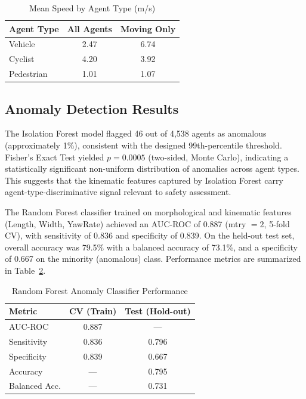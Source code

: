 \documentclass[conference]{IEEEtran}
\begin{document}
\begin{table}[h]
\centering
\caption{Mean Speed by Agent Type (m/s)}
\label{tab:speeds}
\begin{tabular}{lcc}
\toprule
Agent Type & All Agents & Moving Only \\
\midrule
Vehicle    & 2.47       & 6.74        \\
Cyclist    & 4.20       & 3.92        \\
Pedestrian & 1.01       & 1.07        \\
\bottomrule
\end{tabular}
\end{table}

\subsection{Anomaly Detection Results}

The Isolation Forest model flagged 46 out of 4{,}538 agents as anomalous (approximately 1\%), consistent with the designed 99th-percentile threshold. Fisher's Exact Test yielded $p = 0.0005$ (two-sided, Monte Carlo), indicating a statistically significant non-uniform distribution of anomalies across agent types. This suggests that the kinematic features captured by Isolation Forest carry agent-type-discriminative signal relevant to safety assessment.

The Random Forest classifier trained on morphological and kinematic features (Length, Width, YawRate) achieved an AUC-ROC of 0.887 (mtry $= 2$, 5-fold CV), with sensitivity of 0.836 and specificity of 0.839. On the held-out test set, overall accuracy was 79.5\% with a balanced accuracy of 73.1\%, and a specificity of 0.667 on the minority (anomalous) class. Performance metrics are summarized in Table~\ref{tab:rf}.

\begin{table}[h]
\centering
\caption{Random Forest Anomaly Classifier Performance}
\label{tab:rf}
\begin{tabular}{lcc}
\toprule
Metric & CV (Train) & Test (Hold-out) \\
\midrule
AUC-ROC     & 0.887 & ---   \\
Sensitivity & 0.836 & 0.796 \\
Specificity & 0.839 & 0.667 \\
Accuracy    & ---   & 0.795 \\
Balanced Acc.& ---  & 0.731 \\
\bottomrule
\end{tabular}
\end{table}
\end{document}
